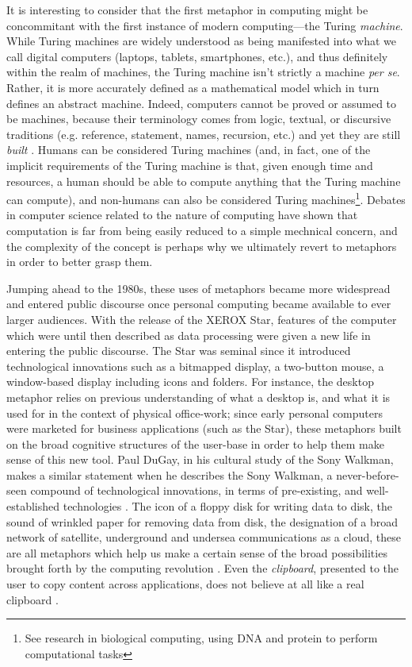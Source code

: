 It is interesting to consider that the first metaphor in computing might be concommitant with the first instance of modern computing—the Turing \emph{machine}. While Turing machines are widely understood as being manifested into what we call digital computers (laptops, tablets, smartphones, etc.), and thus definitely within the realm of machines, the Turing machine isn't strictly a machine \emph{per se}. Rather, it is more accurately defined as a mathematical model which in turn defines an abstract machine. Indeed, computers cannot be proved or assumed to be machines, because their terminology comes from logic, textual, or discursive traditions (e.g. reference, statement, names, recursion, etc.) and yet they are still \emph{built} \citep{smith_origin_1998}. Humans can be considered Turing machines (and, in fact, one of the implicit requirements of the Turing machine is that, given enough time and resources, a human should be able to compute anything that the Turing machine can compute), and non-humans can also be considered Turing machines\footnote{See research in biological computing, using DNA and protein to perform computational tasks}. Debates in computer science related to the nature of computing \citep{rapaport_philosophy_2005} have shown that computation is far from being easily reduced to a simple mechnical concern, and the complexity of the concept is perhaps why we ultimately revert to metaphors in order to better grasp them.

Jumping ahead to the 1980s, these uses of metaphors became more widespread and entered public discourse once personal computing became available to ever larger audiences. With the release of the XEROX Star, features of the computer which were until then described as data processing were given a new life in entering the public discourse. The Star was seminal since it introduced technological innovations such as a bitmapped display, a two-button mouse, a window-based display including icons and folders. For instance, the desktop metaphor relies on previous understanding of what a desktop is, and what it is used for in the context of physical office-work; since early personal computers were marketed for business applications (such as the Star), these metaphors built on the broad cognitive structures of the user-base in order to help them make sense of this new tool. Paul DuGay, in his cultural study of the Sony Walkman, makes a similar statement when he describes the Sony Walkman, a never-before-seen compound of technological innovations, in terms of pre-existing, and well-established technologies \citep{gay_doing_2013}. The icon of a floppy disk for writing data to disk, the sound of wrinkled paper for removing data from disk, the designation of a broad network of satellite, underground and undersea communications as a cloud, these are all metaphors which help us make a certain sense of the broad possibilities brought forth by the computing revolution \citep{wyatt_danger_2004}. Even the \emph{clipboard}, presented to the user to copy content across applications, does not believe at all like a real clipboard \citep{barrera_how_2022}.

